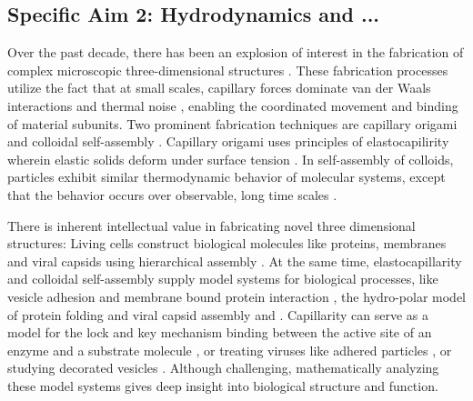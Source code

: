\subsection{Specific Aim 2: Hydrodynamics and ...}
\label{subsec:specific_aim_2}
%
Over the past decade, there has been an explosion of interest in the fabrication of complex microscopic three-dimensional structures 
\cite{Cho2010}. These fabrication processes utilize the fact that at small scales, capillary forces dominate  van der Waals interactions and thermal noise  \cite{Zhang2017}, enabling the coordinated movement and binding of material subunits. Two prominent fabrication techniques are capillary origami 
\cite{Pandey2011,Leong2007,Reynolds2019} and colloidal self-assembly \cite{Dasgupta2017,Siontorou2017}. Capillary origami uses principles of elastocapilirity wherein elastic solids deform under surface tension \cite{Bico2018,VanHonschoten2010}. In self-assembly of colloids, 
particles exhibit similar thermodynamic behavior of molecular systems, except that the behavior occurs over observable, long time scales \cite{Zhang2017}. 

There is inherent intellectual value in fabricating novel three dimensional structures: Living cells construct biological molecules like proteins, membranes and viral capsids using hierarchical assembly \cite{Whitesides2002}. At the same time, elastocapillarity and colloidal self-assembly supply model systems for biological processes, like vesicle adhesion and membrane bound protein interaction \cite{Dasgupta2017}, the hydro-polar model of protein folding \cite{Lau1989,Pandey2011} and viral capsid assembly and \cite{CASPAR1962}. Capillarity can serve as a model for the lock and key mechanism binding between the active site of an enzyme and a substrate molecule \cite{Araujo2018}, or treating viruses like adhered particles 
\cite{Agudo-Canalejo2017,Agudo-Canalejo2015,Deserno2004}, or studying decorated vesicles 
\cite{Auth2009,Weikl2002,Atilgan2007}. Although challenging, mathematically analyzing these model systems gives deep insight into biological structure and function.

